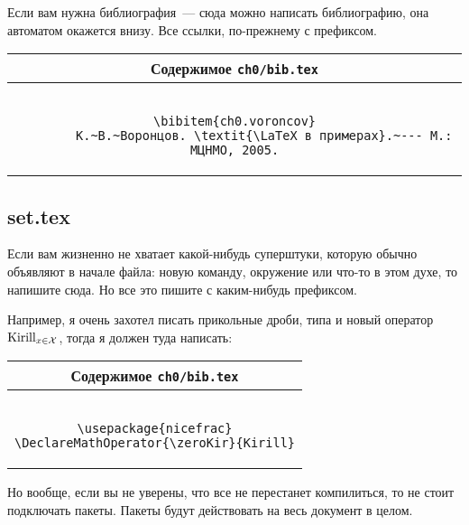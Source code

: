Если вам нужна библиография~--- сюда можно написать библиографию, она автоматом окажется внизу. Все ссылки, по-прежнему с префиксом.
\begin{center}
\begin{tabular}{|c|}
\hline
        Содержимое \texttt{ch0/bib.tex}

\\ \hline        
        \begin{minipage}{6in}
                \begin{verbatim}

\bibitem{ch0.voroncov}
        К.~В.~Воронцов. \textit{\LaTeX в примерах}.~--- М.: МЦНМО, 2005.
                \end{verbatim}
        \end{minipage}
\\ \hline
\end{tabular}
\end{center}


\subsection{set.tex}

Если вам жизненно не хватает какой-нибудь суперштуки, которую обычно объявляют в начале файла: новую команду, окружение или что-то в этом духе, то напишите сюда. Но все это пишите с каким-нибудь префиксом.

Например, я очень захотел писать прикольные дроби, типа  и новый оператор $\zeroKir\limits_{x\in\SetX}$, тогда я должен туда написать:

\begin{center}
\begin{tabular}{|c|}
\hline
        Содержимое \texttt{ch0/bib.tex}

\\ \hline        
        \begin{minipage}{6in}
                \begin{verbatim}

\usepackage{nicefrac}
\DeclareMathOperator{\zeroKir}{Kirill}
                \end{verbatim}
        \end{minipage}
\\ \hline
\end{tabular}
\end{center}
Но вообще, если вы не уверены, что все не перестанет компилиться, то не стоит подключать пакеты.
Пакеты будут действовать на весь документ в целом.


